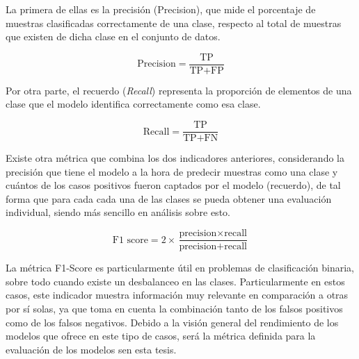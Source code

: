La primera de ellas es la precisión (Precision), que mide el porcentaje de muestras clasificadas correctamente de una clase, respecto al total de muestras que existen de dicha clase en el conjunto de datos.

$$\text{Precision} = \frac{{\text{TP}}}{{\text{TP} + \text{FP}}}$$

Por otra parte, el recuerdo (\textit{Recall}) representa la proporción de elementos de una clase que el modelo identifica correctamente como esa clase.

$$\text{Recall} = \frac{{\text{TP}}}{{\text{TP} + \text{FN}}}$$

Existe otra métrica que combina los dos indicadores anteriores, considerando la precisión que tiene el modelo a la hora de predecir muestras como una clase y cuántos de los casos positivos fueron captados por el modelo (recuerdo), de tal forma que para cada cada una de las clases se pueda obtener una evaluación individual, siendo más sencillo en análisis sobre esto. 

$$\text{F1 score} = 2 \times \frac{{\text{precision} \times \text{recall}}}{{\text{precision} + \text{recall}}}$$




La métrica F1-Score es particularmente útil en problemas de clasificación binaria, sobre todo cuando existe un desbalanceo en las clases. Particularmente en estos casos, este indicador muestra información muy relevante en comparación a otras por sí solas, ya que toma en cuenta la combinación tanto de los falsos positivos como de los falsos negativos. Debido a la visión general del rendimiento de los modelos que ofrece en este tipo de casos, será la métrica definida para la evaluación de los modelos sen esta tesis.


